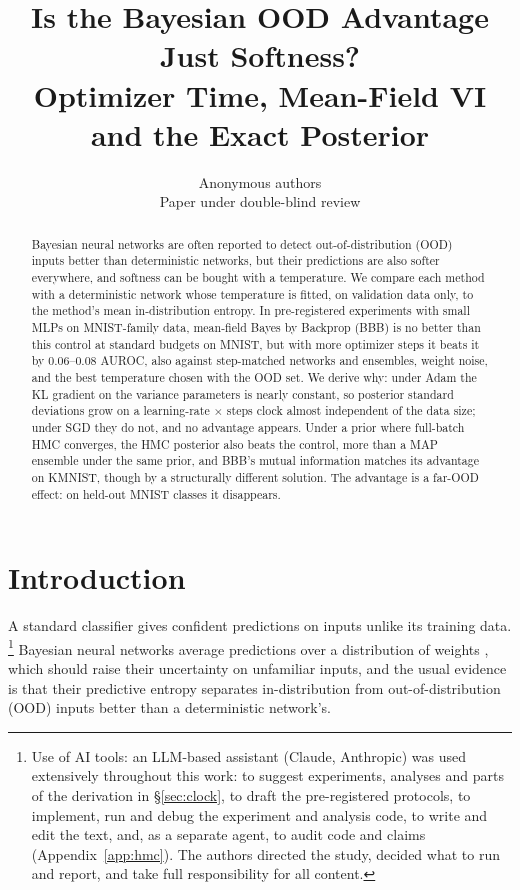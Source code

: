 \documentclass[10pt]{article}
\title{Is the Bayesian OOD Advantage Just Softness?\\Optimizer Time, Mean-Field VI and the Exact Posterior}
\author{\name Anonymous authors\\
      \addr Paper under double-blind review}
\begin{document}
\maketitle

\begin{abstract}
Bayesian neural networks are often reported to detect out-of-distribution
(OOD) inputs better than deterministic networks, but their predictions are
also softer everywhere, and softness can be bought with a temperature. We
compare each method with a deterministic network whose temperature is
fitted, on validation data only, to the method's mean in-distribution
entropy. In pre-registered experiments with small MLPs on MNIST-family data,
mean-field Bayes by Backprop (BBB) is no better than this control at standard
budgets on MNIST, but with more optimizer steps it beats it by 0.06--0.08
AUROC, also against step-matched networks and ensembles, weight noise, and
the best temperature chosen with the OOD set. We derive why: under Adam the
KL gradient on the variance parameters is nearly constant, so posterior
standard deviations grow on a learning-rate $\times$ steps clock almost
independent of the data size; under SGD they do not, and no advantage
appears. Under a prior where full-batch HMC converges, the HMC posterior
also beats the control, more than a MAP ensemble under the same prior, and
BBB's mutual information matches its advantage on KMNIST, though by a
structurally different solution. The advantage is a far-OOD effect: on
held-out MNIST classes it disappears.
\end{abstract}

\section{Introduction}
A standard classifier gives confident predictions on inputs unlike its
training data.%
\footnote{Use of AI tools: an LLM-based assistant (Claude, Anthropic) was used
extensively throughout this work: to suggest experiments, analyses and parts
of the derivation in \S\ref{sec:clock}, to draft the pre-registered protocols,
to implement, run and debug the experiment and analysis code, to write and edit
the text, and, as a separate agent, to audit code and claims
(Appendix~\ref{app:hmc}). The authors directed the study, decided what to run
and report, and take full responsibility for all content.} Bayesian neural networks average predictions over a
distribution of weights \citep{blundell2015weight}, which should raise their
uncertainty on unfamiliar inputs, and the usual evidence is that their
predictive entropy separates in-distribution from out-of-distribution (OOD)
inputs better than a deterministic network's.
\end{document}
